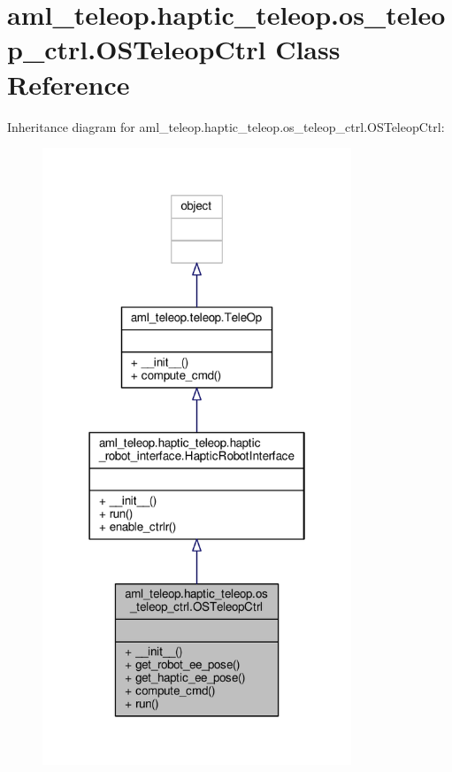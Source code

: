 \hypertarget{classaml__teleop_1_1haptic__teleop_1_1os__teleop__ctrl_1_1_o_s_teleop_ctrl}{\section{aml\-\_\-teleop.\-haptic\-\_\-teleop.\-os\-\_\-teleop\-\_\-ctrl.\-O\-S\-Teleop\-Ctrl Class Reference}
\label{classaml__teleop_1_1haptic__teleop_1_1os__teleop__ctrl_1_1_o_s_teleop_ctrl}
}


Inheritance diagram for aml\-\_\-teleop.\-haptic\-\_\-teleop.\-os\-\_\-teleop\-\_\-ctrl.\-O\-S\-Teleop\-Ctrl\-:
\nopagebreak
\begin{figure}[H]
\begin{center}
\leavevmode
\includegraphics[width=262pt]{classaml__teleop_1_1haptic__teleop_1_1os__teleop__ctrl_1_1_o_s_teleop_ctrl__inherit__graph}
\end{center}
\end{figure}


